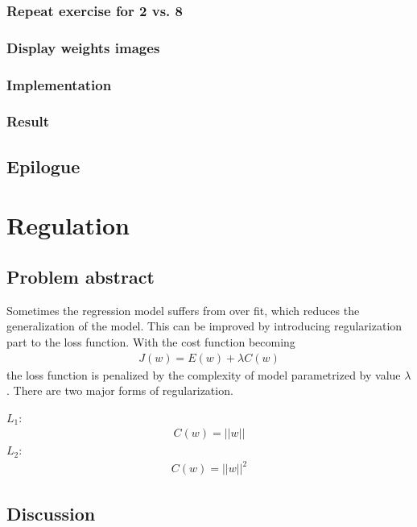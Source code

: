 \documentclass{article}
\begin{document}
\subsubsection{}
\subsubsection{}
\subsubsection{Repeat exercise for 2 vs. 8}
\subsubsection{Display weights images}

\subsubsection{Implementation}
\subsubsection{Result}
\subsection{Epilogue}

\section{Regulation}
\subsection{Problem abstract}
Sometimes the regression model suffers from over fit, which reduces the generalization of the model. This can be improved by introducing regularization part to the loss function. With the cost function becoming \begin{align*}
J(w) = E(w) + \lambda C(w)
\end{align*}
 the loss function is penalized by the complexity of model parametrized by value $\lambda$. There are two major forms of regularization. 
 
 $L_1:$\begin{align*}
  C(w) = ||w||
  \end{align*}
 $L_2:$\begin{align*}
 C(w) = ||w||^2
 \end{align*}
\subsection{Discussion}
\end{document}
